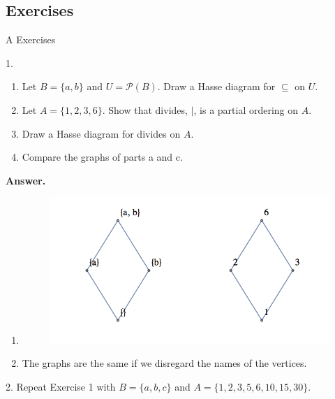 \documentclass[10pt,]{book}
\theoremstyle{plain}
\theoremstyle{definition}
\theoremstyle{definition}
\theoremstyle{definition}
\theoremstyle{definition}
\begin{document}
\subsection[Exercises]{Exercises}\label{exercises-6-3}
\hypertarget{exercisegroup-5}{}\typeout{************************************************}
\typeout{************************************************}
A Exercises%
\begin{exercisegroup}
\item[1.]\hypertarget{exercise-13}{}\leavevmode%
\begin{enumerate}[label=\alph*]
\item\hypertarget{li-40}{}Let \(B = \{a, b\}\) and \(U = \mathcal{P}(B)\). Draw a Hasse diagram for \(\subseteq \) on \(U\).%
\item\hypertarget{li-41}{}Let \(A = \{1,2, 3, 6\}\). Show that divides, \(\mid \), is a partial ordering on \(A\). %
\item\hypertarget{li-42}{}Draw a Hasse diagram for divides on \(A\).%
\item\hypertarget{li-43}{}Compare the graphs of parts a and c.%
\end{enumerate}
%
\par\smallskip
\par\smallskip
\noindent\textbf{Answer.}\hypertarget{answer-7}{}\quad
\leavevmode%
\begin{enumerate}[label=\alph*]
\item\hypertarget{li-44}{}\leavevmode%
\begin{figure}
\centering
\includegraphics[width=1\linewidth]{images/fig-sol-6-3-1.png}
\end{figure}
%
\item\hypertarget{li-45}{} The graphs are the same if we disregard the names of the vertices.%
\end{enumerate}
%
\item[2.]\hypertarget{exercise-14}{}Repeat Exercise 1 with \(B = \{a, b, c\}\) and \( A = \{1, 2, 3, 5, 6, 10, 15, 30\}\).

\end{exercisegroup}
\end{document}
